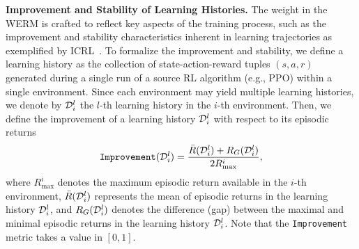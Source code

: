 \documentclass{article}
\begin{document}
\textbf{Improvement and Stability of Learning Histories.}
%
%
%
%
The weight in the WERM is crafted to reflect key aspects of the training process, such as the improvement and stability characteristics inherent in learning trajectories as exemplified by ICRL~\cite{laskin2022context, zisman2024emergence}.
%
To formalize the improvement and stability, we define a learning history as the collection of state-action-reward tuples $(s, a, r)$ generated during a single run of a source RL algorithm (e.g., PPO) within a single environment. Since each environment may yield multiple learning histories, we denote by ${\mathcal D}_i^l$ the $l$-th learning history in the $i$-th environment.
%
Then, we define the improvement of a learning history ${\mathcal D}_i^l$ with respect to its episodic returns %
%
\begin{align}
    \texttt{Improvement}({\mathcal D}_i^l) = \frac{\bar{R}({\mathcal D}_i^l) + R_G({\mathcal D}_i^l)}{2 R_\text{max}^i}, 
\end{align}
%
where $R_\text{max}^i$ denotes the maximum episodic return available in the $i$-th environment, $\bar{R}({\mathcal D}_i^l)$ represents the mean of episodic returns in the learning history ${\mathcal D}_i^l$, and $R_G({\mathcal D}_i^l)$ denotes the difference (gap) between the maximal and minimal episodic returns in the learning history ${\mathcal D}_i^l$. Note that the \texttt{Improvement} metric takes a value in $[0, 1]$.
\end{document}
